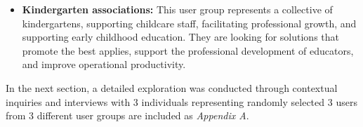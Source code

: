 \begin{itemize}
    \item \textbf{Kindergarten associations:} This user group represents a collective of kindergartens, supporting childcare staff, facilitating professional growth, and supporting early childhood education. They are looking for solutions that promote the best applies, support the professional development of educators, and improve operational productivity.
\end{itemize}

In the next section, a detailed exploration was conducted through contextual inquiries and interviews with 3 individuals representing randomly selected 3 users from 3 different user groups are included as \emph{Appendix A}.

